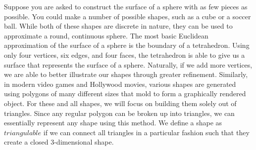 \documentclass[12pt]{article}
\begin{document}
Suppose you are asked to construct the surface of a sphere with as few pieces as possible. You could make a number of possible shapes, such as a cube or a soccer ball. While both of these shapes are discrete in nature, they can be used to approximate a round, continuous sphere. The most basic Euclidean approximation of the surface of a sphere is the boundary of a tetrahedron. Using only four vertices, six edges, and four faces, the tetrahedron is able to give us a surface that represents the surface of a sphere. Naturally, if we add more vertices, we are able to better illustrate our shapes through greater refinement. Similarly, in modern video games and Hollywood movies, various shapes are generated using polygons of many different sizes that mold to form a graphically rendered object. For these and all shapes, we will focus on building them solely out of triangles. Since any regular polygon can be broken up into triangles, we can essentially represent any shape using this method. We define a shape as $triangulable$ if we can connect all triangles in a particular fashion such that they create a closed 3-dimensional shape.\newline
\end{document}
